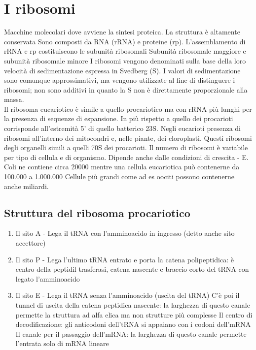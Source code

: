 \documentclass{article}
\begin{document}
\section{I ribosomi}
Macchine molecolari dove avviene la sintesi proteica. La struttura è altamente conservata
Sono composti da RNA (rRNA) e proteine (rp). L'assemblamento di rRNA e rp costituiscono le subunità ribosomali
Subunità ribosomale maggiore e subunità ribosomale minore
I ribosomi vengono denominati sulla base della loro velocità
di sedimentazione espressa in Svedberg (S).
I valori di sedimentazione sono comunque approssimativi,
ma vengono utilizzate al fine di distinguere i ribosomi; non sono additivi in quanto la S
non è direttamente proporzionale alla massa.\\
Il ribosoma eucariotico è simile a quello procariotico ma con rRNA più lunghi per la presenza di sequenze
di espansione. In più rispetto a quello dei procarioti corrisponde all'estremità 5' di quello batterico 23S.
Negli eucarioti presenza di ribosomi all'interno dei mitocondri e, nelle
piante, dei cloroplasti. Questi ribosomi degli organelli simili a quelli 70S dei
procarioti. Il numero di ribosomi è variabile per tipo di cellula e di organismo. Dipende anche dalle
condizioni di crescita - E. Coli ne contiene circa 20000 mentre una cellula eucariotica può contenerne da 100.000 a 1.000.000
Cellule più grandi come ad es oociti possono contenerne anche miliardi.
\subsection{Struttura del ribosoma procariotico}
\begin{enumerate}
    \item Il sito A - Lega il tRNA con l'amminoacido in ingresso (detto anche sito accettore)
    \item Il sito P - Lega l'ultimo tRNA entrato e porta la catena polipeptidica: è centro della peptidil trasferasi, catena nascente e braccio corto del tRNA con legato l'amminoacido
    \item Il sito E - Lega il tRNA senza l'amminoacido (uscita del tRNA)
    \subitem C'è poi il tunnel di uscita della catena peptidica nascente: la larghezza di questo canale permette la struttura ad alfa elica ma non strutture più complesse
    \subitem Il centro di decodificazione: gli anticodoni dell'tRNA si appaiano con i codoni dell'mRNA
    \subitem Il canale per il passaggio dell'mRNA: la larghezza di questo canale permette l'entrata solo di mRNA lineare
\end{enumerate}
\end{document}
